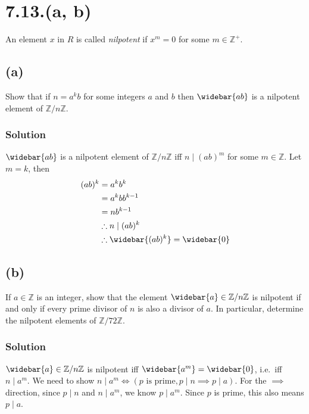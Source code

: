 \documentclass[fleqn]{article}
\begin{document}
    \section{7.13.(a, b)}
    An element $x$ in $R$ is called \textit{nilpotent} if $x^m = 0$ for some $m \in \mathbb{Z}^+$.
        
        \subsection{(a)}
        Show that if $n = a^k b$ for some integers $a$ and $b$ then $\widebar{ab}$ is a nilpotent element of $\mathbb{Z}/n\mathbb{Z}$.
            
            \subsubsection{Solution}
            $\widebar{ab}$ is a nilpotent element of $\mathbb{Z}/n\mathbb{Z}$ iff $n \mid (ab)^m$ for some $m \in \mathbb{Z}$.  Let $m = k$, then
            \begin{align}
                (ab)^k &= a^k b^k \\
                    &= a^k b b^{k - 1} \\
                    &= n b^{k - 1} \\
                &\therefore{} n \mid (ab)^k \\
                &\therefore{} \widebar{(ab)^k} = \widebar{0}
            \end{align}
        
        \subsection{(b)}
        If $a \in \mathbb{Z}$ is an integer, show that the element $\widebar{a} \in \mathbb{Z}/n\mathbb{Z}$ is nilpotent if and only if every prime divisor of $n$ is also a divisor of $a$.  In particular, determine the nilpotent elements of $\mathbb{Z}/72\mathbb{Z}$.
        
            \subsubsection{Solution}
            $\widebar{a} \in \mathbb{Z}/n\mathbb{Z}$ is nilpotent iff $\widebar{a^m} = \widebar{0}$, i.e.\ iff $n \mid a^m$.  We need to show $n \mid a^m \iff (p \text{ is prime}, p \mid n \implies p \mid a)$.  For the $\implies$ direction, since $p \mid n$ and $n \mid a^m$, we know $p \mid a^m$.  Since $p$ is prime, this also means $p \mid a$.
            
\end{document}
